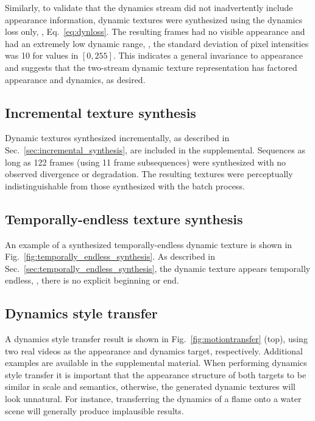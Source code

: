 Similarly, to validate that the dynamics stream did not 
inadvertently include appearance information, dynamic textures were synthesized
using the dynamics loss only, \ie, Eq.\ \ref{eq:dynloss}.
The resulting frames had no visible appearance and had
an extremely low dynamic range, \ie, the standard
deviation of pixel intensities was 10 for values in $[0,255]$. 
This indicates a general invariance to appearance and 
suggests that the two-stream dynamic texture representation
has factored appearance and dynamics, as desired.



\subsection{Incremental texture synthesis}

Dynamic textures synthesized incrementally, as described in Sec.\
\ref{sec:incremental_synthesis}, are included in the supplemental.
Sequences as long as 122 frames (using 11 frame subsequences) were synthesized
with no observed divergence or degradation. The resulting textures were 
perceptually indistinguishable from those synthesized with the batch process. 

\subsection{Temporally-endless texture synthesis}

An example of a synthesized temporally-endless dynamic texture is shown in
Fig.\ \ref{fig:temporally_endless_synthesis}. As described in Sec.\ 
\ref{sec:temporally_endless_synthesis}, the dynamic texture appears
temporally endless, \ie, there is no explicit beginning or end.



\subsection{Dynamics style transfer}

A dynamics style transfer result is shown in Fig.\ 
\ref{fig:motiontransfer} (top), using two real videos as the appearance and dynamics target, respectively.
Additional examples are available in the supplemental material. 
When performing dynamics style transfer it is important
that the appearance structure of both targets to be similar in scale and semantics,
otherwise, the generated dynamic textures will look unnatural.
For instance, transferring the dynamics of a flame onto a water 
scene will generally produce implausible results. 

